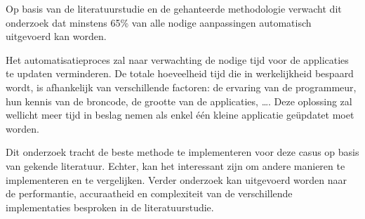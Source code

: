 Op basis van de literatuurstudie en de gehanteerde methodologie verwacht dit onderzoek dat minstens 65\% van alle nodige aanpassingen automatisch uitgevoerd kan worden.

Het automatisatieproces zal naar verwachting de nodige tijd voor de applicaties te updaten verminderen.
De totale hoeveelheid tijd die in werkelijkheid bespaard wordt, is afhankelijk van verschillende factoren: de ervaring van de programmeur, hun kennis van de broncode, de grootte van de applicaties, \dots.
Deze oplossing zal wellicht meer tijd in beslag nemen als enkel één kleine applicatie geüpdatet moet worden.

Dit onderzoek tracht de beste methode te implementeren voor deze casus op basis van gekende literatuur.
Echter, kan het interessant zijn om andere manieren te implementeren en te vergelijken.
Verder onderzoek kan uitgevoerd worden naar de performantie, accuraatheid en complexiteit van de verschillende implementaties besproken in de literatuurstudie.

